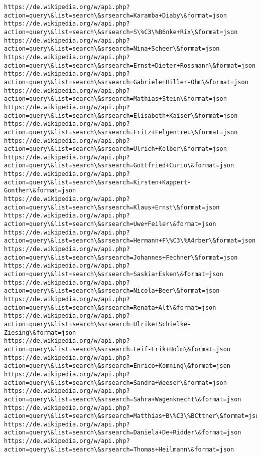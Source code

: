 \documentclass[11pt]{article}
\begin{document}
\begin{Verbatim}[commandchars=\\\{\}]
https://de.wikipedia.org/w/api.php?action=query\&list=search\&srsearch=Karamba+Diaby\&format=json
https://de.wikipedia.org/w/api.php?action=query\&list=search\&srsearch=S\%C3\%B6nke+Rix\&format=json
https://de.wikipedia.org/w/api.php?action=query\&list=search\&srsearch=Nina+Scheer\&format=json
https://de.wikipedia.org/w/api.php?action=query\&list=search\&srsearch=Ernst+Dieter+Rossmann\&format=json
https://de.wikipedia.org/w/api.php?action=query\&list=search\&srsearch=Gabriele+Hiller-Ohm\&format=json
https://de.wikipedia.org/w/api.php?action=query\&list=search\&srsearch=Mathias+Stein\&format=json
https://de.wikipedia.org/w/api.php?action=query\&list=search\&srsearch=Elisabeth+Kaiser\&format=json
https://de.wikipedia.org/w/api.php?action=query\&list=search\&srsearch=Fritz+Felgentreu\&format=json
https://de.wikipedia.org/w/api.php?action=query\&list=search\&srsearch=Ulrich+Kelber\&format=json
https://de.wikipedia.org/w/api.php?action=query\&list=search\&srsearch=Gottfried+Curio\&format=json
https://de.wikipedia.org/w/api.php?action=query\&list=search\&srsearch=Kirsten+Kappert-Gonther\&format=json
https://de.wikipedia.org/w/api.php?action=query\&list=search\&srsearch=Klaus+Ernst\&format=json
https://de.wikipedia.org/w/api.php?action=query\&list=search\&srsearch=Uwe+Feiler\&format=json
https://de.wikipedia.org/w/api.php?action=query\&list=search\&srsearch=Hermann+F\%C3\%A4rber\&format=json
https://de.wikipedia.org/w/api.php?action=query\&list=search\&srsearch=Johannes+Fechner\&format=json
https://de.wikipedia.org/w/api.php?action=query\&list=search\&srsearch=Saskia+Esken\&format=json
https://de.wikipedia.org/w/api.php?action=query\&list=search\&srsearch=Nicola+Beer\&format=json
https://de.wikipedia.org/w/api.php?action=query\&list=search\&srsearch=Renata+Alt\&format=json
https://de.wikipedia.org/w/api.php?action=query\&list=search\&srsearch=Ulrike+Schielke-Ziesing\&format=json
https://de.wikipedia.org/w/api.php?action=query\&list=search\&srsearch=Leif-Erik+Holm\&format=json
https://de.wikipedia.org/w/api.php?action=query\&list=search\&srsearch=Enrico+Komning\&format=json
https://de.wikipedia.org/w/api.php?action=query\&list=search\&srsearch=Sandra+Weeser\&format=json
https://de.wikipedia.org/w/api.php?action=query\&list=search\&srsearch=Sahra+Wagenknecht\&format=json
https://de.wikipedia.org/w/api.php?action=query\&list=search\&srsearch=Matthias+B\%C3\%BCttner\&format=json
https://de.wikipedia.org/w/api.php?action=query\&list=search\&srsearch=Daniela+De+Ridder\&format=json
https://de.wikipedia.org/w/api.php?action=query\&list=search\&srsearch=Thomas+Heilmann\&format=json

\end{Verbatim}
\end{document}
